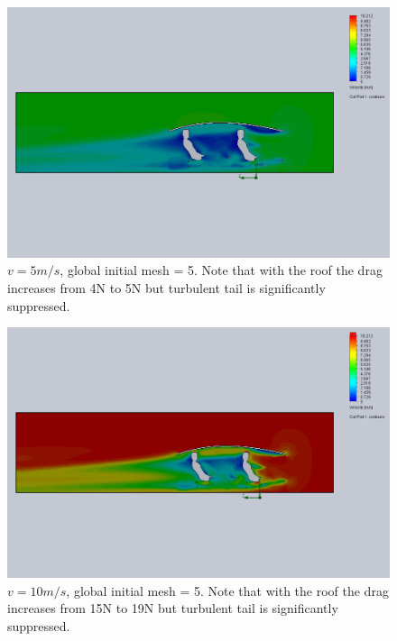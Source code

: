 \documentclass[11pt]{article}
\begin{document}
\begin{figure}[ht]
\includegraphics[width=\textwidth]{gm_5_rf_7_v05_roof1.png}
\caption{$v = 5 m/s$, global initial mesh = 5. Note that with the roof the drag increases from 4N to 5N but turbulent tail is significantly suppressed.}
\end{figure}

\begin{figure}[ht]
\includegraphics[width=\textwidth]{gm_5_rf_7_v10_roof1.png}
\caption{$v = 10 m/s$, global initial mesh = 5. Note that with the roof the drag increases from 15N to 19N but turbulent tail is significantly suppressed.}
\end{figure}
\end{document}
